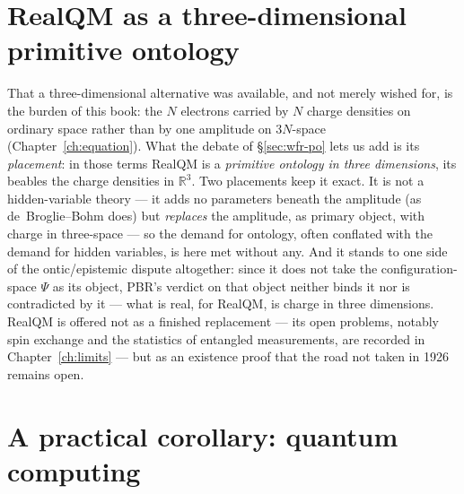 \section{RealQM as a three-dimensional primitive ontology}\label{sec:onto-realqm}

That a three-dimensional alternative was available, and not merely wished for, is the burden of this book: the
$N$ electrons carried by $N$ charge densities on ordinary space rather than by one amplitude on $3N$-space
(Chapter~\ref{ch:equation}). What the debate of \S\ref{sec:wfr-po} lets us add is its \emph{placement}: in those
terms RealQM is a \emph{primitive ontology in three dimensions}, its beables the charge densities in $\mathbb R^3$. Two placements keep it exact. It is not a hidden-variable theory --- it adds
no parameters beneath the amplitude (as de~Broglie--Bohm does) but \emph{replaces} the amplitude, as primary
object, with charge in three-space --- so the demand for ontology, often conflated with the demand for hidden
variables, is here met without any. And it stands to one side of the ontic/epistemic dispute altogether: since it
does not take the configuration-space $\Psi$ as its object, PBR's verdict on that object neither binds it nor is
contradicted by it --- what is real, for RealQM, is charge in three dimensions. RealQM is offered not as a
finished replacement --- its open problems, notably spin
exchange and the statistics of entangled measurements, are recorded in Chapter~\ref{ch:limits} --- but as an
existence proof that the road not taken in 1926 remains open.

\section{A practical corollary: quantum computing}\label{sec:onto-qc}

